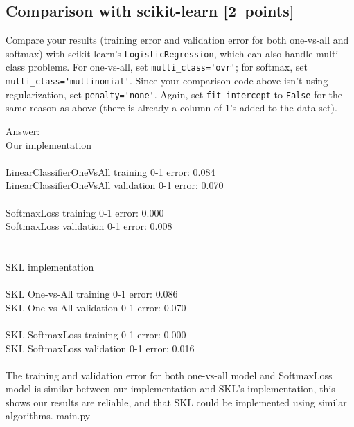 \documentclass{article}
\newcommand{\blu}[1]{{\textcolor{blu}{#1}}}
\newcommand{\gre}[1]{\textcolor{gre}{#1}}
\newcommand\ans[1]{\par\gre{Answer: #1}}
\let\ask\blu
\newcommand\pts[1]{\textcolor{pointscolour}{[#1~points]}}
\begin{document}
\subsection{Comparison with scikit-learn \pts{2}}
\ask{Compare your results (training error and validation error for both one-vs-all and softmax) with scikit-learn's \texttt{LogisticRegression}},
which can also handle multi-class problems.
For one-vs-all, set \verb|multi_class='ovr'|; for softmax, set \verb|multi_class='multinomial'|.
Since your comparison code above isn't using regularization, set \verb|penalty='none'|.
Again, set \verb|fit_intercept| to \verb|False| for the same reason as above (there is already a column of $1$'s added to the data set).
\ans{\\
Our implementation\\
\\
LinearClassifierOneVsAll training 0-1 error: 0.084\\
LinearClassifierOneVsAll validation 0-1 error: 0.070\\
\\
SoftmaxLoss training 0-1 error: 0.000\\
SoftmaxLoss validation 0-1 error: 0.008\\
\\
\\
SKL implementation\\
\\
SKL One-vs-All training 0-1 error: 0.086\\
SKL One-vs-All validation 0-1 error: 0.070\\
\\
SKL SoftmaxLoss training 0-1 error: 0.000\\
SKL SoftmaxLoss validation 0-1 error: 0.016\\
\\
The training and validation error for both one-vs-all model and SoftmaxLoss model is similar between our implementation and SKL's implementation, this shows our results are reliable, and that SKL could be implemented using similar algorithms.
}
\newpage
\gre{main.py}
\end{document}
